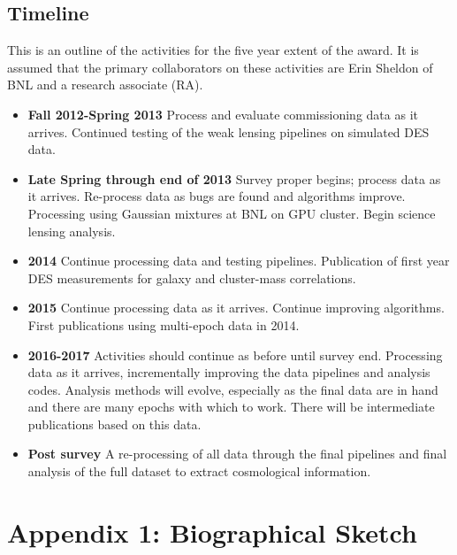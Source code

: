 \documentclass[12pt]{article}
\begin{document}
\clearpage
\newpage
\subsection{Timeline} \label{sec:timeline}

This is an outline of the activities for the five year extent of the award.  It
is assumed that the primary collaborators on these activities are Erin Sheldon
of BNL and a research associate (RA).

\begin{itemize}

\item {\bf Fall 2012-Spring 2013} Process and evaluate commissioning data as it
arrives.  Continued testing of the weak lensing pipelines on simulated
DES data.

\item {\bf Late Spring through end of 2013} Survey proper begins; process data
as it arrives.  Re-process data as bugs are found and algorithms improve.
Processing using Gaussian mixtures at BNL on GPU cluster.  Begin science
lensing analysis.

\item {\bf 2014} Continue processing data and testing pipelines.  Publication
of first year DES measurements for galaxy and cluster-mass correlations.

\item {\bf 2015} Continue processing data as it arrives.  Continue
improving algorithms.   First publications using multi-epoch data
in 2014.

\item {\bf 2016-2017}  Activities should continue as before until survey end.
Processing data as it arrives, incrementally improving the data pipelines and
analysis codes.  Analysis methods will evolve, especially as the final data are
in hand and there are many epochs with which to work.   There will be
intermediate publications based on this data.

\item {\bf Post survey} A re-processing of all data through the final pipelines
and final analysis of the full dataset to extract cosmological information.


\end{itemize}







\newpage
{}
\section*{Appendix 1: Biographical Sketch}
\end{document}
